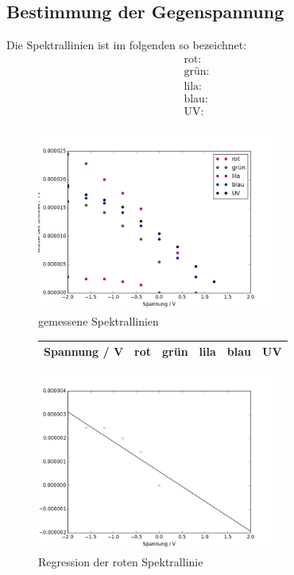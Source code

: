 \subsection{Bestimmung der Gegenspannung}
Die Spektrallinien ist im folgenden so bezeichnet:
\begin{align}
	\text{rot:} \quad &  \\
	\text{grün:} \quad &  \\
	\text{lila:} \quad &  \\
	\text{blau:} \quad &  \\
	\text{UV:} \quad &  \\
\end{align}
	
	
	
	
\begin{figure}[h!]
	\centering
	\includegraphics[width=0.7\textwidth]{build/AlleWellenlangen.png}
	\caption{gemessene Spektrallinien}
	\label{fig:spektrallinien}
\end{figure}

\begin{figure}[h!]
	\centering
	\begin{tabular}{c|ccccc}
		Spannung / V & rot & grün & lila & blau & UV \\
		\hline
		
	\end{tabular}
	\label{tab:}
\end{figure}

\begin{figure}[h!]
	\centering
	\includegraphics[width=0.7\textwidth]{build/regression_Farbe:0.png}
	\caption{Regression der roten Spektrallinie}
	\label{fig:regression_rot}
\end{figure}

